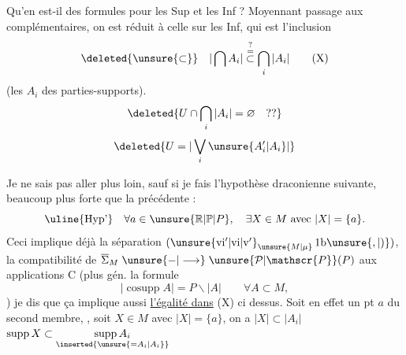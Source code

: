 
Qu'en est-il des formules pour les Sup et les Inf ? Moyennant passage aux complémentaires, on est réduit à celle sur les Inf, qui est l'inclusion
\[
\deleted{\unsure{\subset}}\quad |\bigcap A_i|\mathrel{\overset{\text{?}}{\overset{=}{\subset}}}\bigcap_i|A_i| \tag*{(X)}
\]
(les $A_i$ des parties-supports). 
\[
\deleted{U\cap\bigcap_i|A_i|=\varnothing\quad\text{??}}
\]
\[
\deleted{U=|\bigvee_i\unsure{A'_i|A_i}|}
\]

Je ne sais pas aller plus loin, sauf si je fais l'hypothèse draconienne suivante, beaucoup plus forte que la précédente :
\[
\text{\uline{Hyp'}}\quad \forall a\in\unsure{\mathbb{R}|\mathbb{P}|P},\quad\exists X\in M\text{ avec }|X|=\{a\}.
\]
Ceci implique déjà la séparation $(\unsure{\mathrm{vi}'|\mathrm{vi}|\mathrm{v}'}_{\unsure{M|\mu}}\,1\mathrm{b}\unsure{,|)})$, la compatibilité de $\overline{\Sigma}_M\mathrel{\unsure{-|\longrightarrow}}\unsure{\mathcal{P}|\mathscr{P}}(P)$ aux applications $\mathrm{C}$ (plus gén. la formule
\[
|\operatorname{cosupp}A|=P\smallsetminus|A|\qquad\forall A\subset M,
\]
) je dis que ça implique aussi \uline{l'égalité dans} (X) ci dessus. Soit en effet un pt $a$ du second membre, , soit $X\in M$  avec $|X|=\{a\}$, on a  $|X|\subset|A_i|$ \deleted{$\unsure{\Rightarrow}$} $\operatorname{supp}X\subset\underset{\inserted{\unsure{=A_i|A_i}}}{\operatorname{supp}A_i}$
